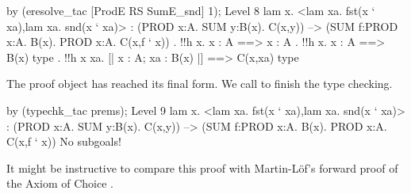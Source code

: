 \begin{ttbox}
by (eresolve_tac [ProdE RS SumE_snd] 1);
{\out Level 8}
{\out lam x. <lam xa. fst(x ` xa),lam xa. snd(x ` xa)>}
{\out : (PROD x:A. SUM y:B(x). C(x,y)) -->}
{\out   (SUM f:PROD x:A. B(x). PROD x:A. C(x,f ` x))}
\ttbreak
{. !!h x. x : A ==> x : A}
{. !!h x. x : A ==> B(x) type}
{. !!h x xa. [| x : A; xa : B(x) |] ==> C(x,xa) type}
\end{ttbox}
The proof object has reached its final form.  We call 
to finish the type checking.
\begin{ttbox}
by (typechk_tac prems);
{\out Level 9}
{\out lam x. <lam xa. fst(x ` xa),lam xa. snd(x ` xa)>}
{\out : (PROD x:A. SUM y:B(x). C(x,y)) -->}
{\out   (SUM f:PROD x:A. B(x). PROD x:A. C(x,f ` x))}
{\out No subgoals!}
\end{ttbox}
It might be instructive to compare this proof with Martin-L\"of's forward
proof of the Axiom of Choice \cite[page~50]{martinlof84}.

